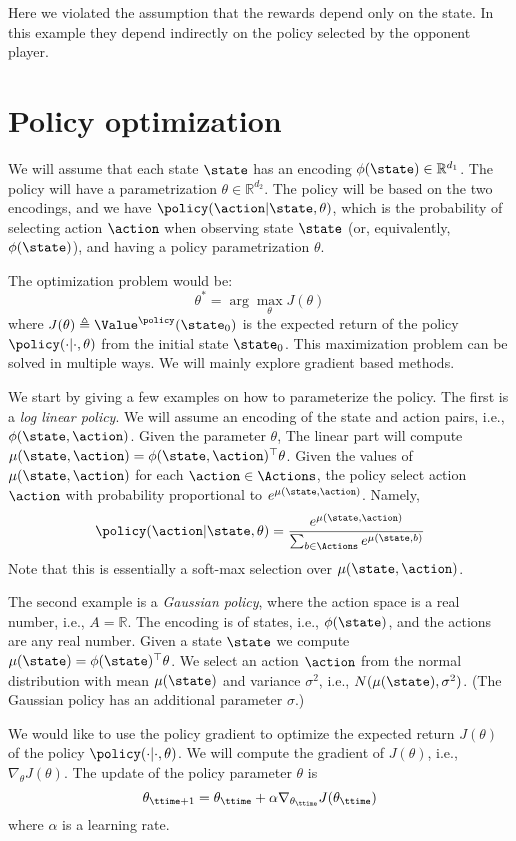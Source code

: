 Here we violated the assumption that the rewards depend only on the
state. In this example they depend indirectly on the policy selected by the opponent player.

\section{Policy optimization}

We will assume that each state $\state$ has an encoding
$\phi(\state)\in \mathbb{R}^{d_1}$. The policy will have a
parametrization $\theta\in \mathbb{R}^{d_2}$. The policy will be
based on the two encodings, and we have
$\policy(\action|\state,\theta)$, which is the probability of
selecting action $\action$ when observing state $\state$ (or,
equivalently, $\phi(\state)$), and having a policy parametrization
$\theta$.

The optimization problem would be:
\[
\theta^* = \arg\max_\theta J(\theta)
\]
where $J(\theta) \triangleq \Value^\policy(\state_0)$ is the
expected return of the policy $\policy(\cdot|\cdot,\theta)$ from the
initial state $\state_0$.
%
This maximization problem can be solved in multiple ways. We will
mainly explore gradient based methods.

We start by giving a few examples on how to parameterize the policy.
The first is a {\em log linear policy}. We will assume an encoding
of the state and action pairs, i.e., $\phi(\state,\action)$. Given the parameter $\theta$, The linear part will compute $\mu(\state,\action)=\phi(\state,\action)^\top \theta$. Given the values of $\mu(\state,\action)$ for each $\action\in \Actions$, the policy select action $\action$ with probability proportional to
$e^{\mu(\state,\action)}$. Namely,
\[
\policy(\action|\state,\theta)=
\frac{e^{\mu(\state,\action)}}{\sum_{b\in
\Actions}e^{\mu(\state,b)}}
\]
Note that this is essentially a soft-max selection over $\mu(\state,\action)$.

The second example is a {\em Gaussian policy}, where the action
space is a real number, i.e., $A=\mathbb{R}$. The encoding is of states, i.e., $\phi(\state)$, and the actions are any real number. Given a state $\state$
we compute $\mu(\state)=\phi(\state)^\top\theta$. We select an
action $\action$ from the normal distribution with mean
$\mu(\state)$ and variance $\sigma^2$, i.e.,
$N(\mu(\state),\sigma^2)$. (The Gaussian policy has an additional
parameter $\sigma$.)

We would like to use the policy gradient to optimize the expected
return  $J(\theta)$ of the policy $\policy(\cdot|\cdot,\theta)$. We
will compute the gradient of $J(\theta)$, i.e., $\nabla_\theta
J(\theta)$. The update of the policy parameter $\theta$ is
\[
\theta_{\ttime+1}=\theta_\ttime + \alpha \nabla_{\theta_\ttime}
J(\theta_\ttime)
\]
where $\alpha$ is a learning rate.

